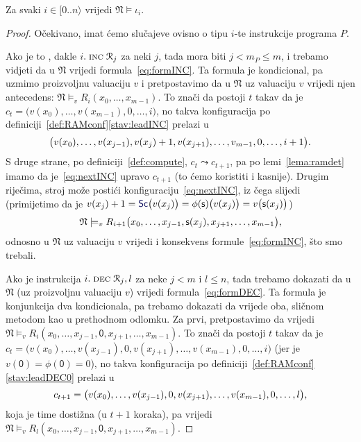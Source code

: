 \begin{lema}[{name=[istinitost instrukcijskih formula u $\mathfrak N$]}]\label{lm:Niotai}
Za svaki $i\in[0..n\rangle$ vrijedi $\mathfrak N\models\iota_i$.
\end{lema}
\begin{proof}
Očekivano, imat ćemo slučajeve ovisno o tipu $i$-te instrukcije programa $P$.

Ako je to \inc, dakle $i.\;\textsc{inc}\;\mathcal R_{j}$ za neki $j$, tada mora biti $j<m_P\le m$, i trebamo vidjeti da u $\mathfrak N$ vrijedi formula~\eqref{eq:formINC}. Ta formula je kondicional, pa uzmimo proizvoljnu valuaciju $v$ i pretpostavimo da u $\mathfrak N$ uz valuaciju $v$ vrijedi njen antecedens: $\mathfrak N\models_v R_i(x_0,\dotsc,x_{m-1})$. To znači da postoji $t$ takav da je $c_t=\bigl(v(x_0),\dotsc,v(x_{m-1}),0,\dotsc,i\bigr)$, no takva konfiguracija po definiciji~\ref{def:RAMconf}\eqref{stav:leadINC} prelazi u
\begin{equation}\label{eq:nextINC}
    \bigl(v(x_0),\dotsc,v(x_{j-1}),v(x_j)+1,v(x_{j+1}),\dotsc,v_{m-1},0,\dotsc,i+1\bigr)\text.
\end{equation}
S druge strane, po definiciji~\ref{def:compute}, $c_t\leadsto c_{t+1}$, pa po lemi~\ref{lema:ramdet} imamo da je~\eqref{eq:nextINC} upravo $c_{t+1}$ (to ćemo koristiti i kasnije). Drugim riječima, stroj može postići konfiguraciju~\eqref{eq:nextINC}, iz čega slijedi (primijetimo da je $v(x_j)+1=\f{Sc}\bigl(v(x_j)\bigr)=\phi(\mathsf s)\bigl(v(x_j)\bigr)=v\bigl(\mathsf s(x_j)\bigr)$)
\begin{equation}
    \mathfrak N\models_v R_{i+1}\bigl(x_0,\dotsc,x_{j-1},\mathsf s(x_j),x_{j+1},\dotsc,x_{m-1}\bigr)\text,
\end{equation}
odnosno u $\mathfrak N$ uz valuaciju $v$ vrijedi i konsekvens formule~\eqref{eq:formINC}, što smo trebali.

Ako je instrukcija $i.\;\textsc{dec}\;\mathcal R_{j},l$ za neke $j<m$ i $l\le n$, tada trebamo dokazati da u $\mathfrak N$ (uz proizvoljnu valuaciju $v$) vrijedi formula~\eqref{eq:formDEC}. Ta formula je konjunkcija dva kondicionala, pa trebamo dokazati da vrijede oba, sličnom metodom kao u prethodnom odlomku. Za prvi, pretpostavimo da vrijedi $\mathfrak N\models_v R_i(x_0,\dotsc,x_{j-1},\mathsf0,x_{j+1},\dotsc,x_{m-1})$. To znači da postoji $t$ takav da je $c_t=\bigl(v(x_0),\dotsc,v(x_{j-1}),0,v(x_{j+1}),\dotsc,v(x_{m-1}),0,\dotsc,i\bigr)$ (jer je $v(\mathsf0)=\phi(\mathsf0)=0$), no takva konfiguracija po definiciji~\ref{def:RAMconf}\eqref{stav:leadDEC0} prelazi u
\begin{equation}
    c_{t+1}=\bigl(v(x_0),\dotsc,v(x_{j-1}),0,v(x_{j+1}),\dotsc,v(x_{m-1}),0,\dotsc,l\bigr)\text,
\end{equation}
koja je time dostižna (u $t+1$ koraka), pa vrijedi $\mathfrak N\models_v R_l(x_0,\dotsc,x_{j-1},\mathsf0,x_{j+1},\dotsc,x_{m-1})$.


\end{proof}
